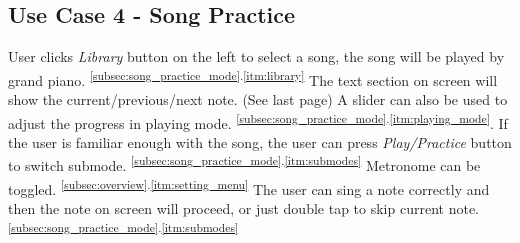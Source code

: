 \documentclass{article}
\begin{document}
\subsection{Use Case 4 - Song Practice}
\qquad
User clicks \textit{Library} button on the left to select a song, the song will be played by grand piano. \textsuperscript{\ref{subsec:song_practice_mode}.\ref{itm:library}}
The text section on screen will show the current/previous/next note.  (See last page)
    A slider can also be used to adjust the progress in playing mode. \textsuperscript{\ref{subsec:song_practice_mode}.\ref{itm:playing_mode}}.
    If the user is familiar enough with the song, the user can press \textit{Play/Practice} button to switch submode.  \textsuperscript{\ref{subsec:song_practice_mode}.\ref{itm:submodes}}
    Metronome can be toggled. \textsuperscript{\ref{subsec:overview}.\ref{itm:setting_menu}}
    The user can sing a note correctly and then the note on screen will proceed, or just double tap to skip current note.  \textsuperscript{\ref{subsec:song_practice_mode}.\ref{itm:submodes}}



\end{document}
